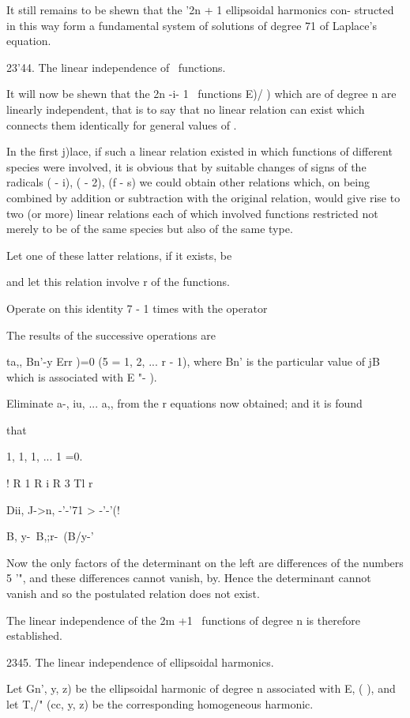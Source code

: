 {{{{{{{It still remains to be shewn that the '2n + 1 ellipsoidal harmonics
con- structed in this way form a fundamental system of solutions of
degree 71 of Laplace's equation.

23'44. The linear independence of \Lame\ functions.

It will now be shewn that the 2n -i- 1 \Lame\ functions E)/ ) which are
of degree n are linearly independent, that is to say that no linear
relation can exist which connects them identically for general values
of .

In the first j)lace, if such a linear relation existed in which
functions of different species were involved, it is obvious that by
suitable changes of signs of the radicals \/( - i), \/( - 2), \/(f -
s) we could obtain other relations which, on being combined by
addition or subtraction with the original relation, would give rise to
two (or more) linear relations each of which involved functions
restricted not merely to be of the same species but also of the same
type.

Let one of these latter relations, if it exists, be

and let this relation involve r of the functions.

Operate on this identity 7 - 1 times with the operator

The results of the successive operations are

ta,, Bn'-y Err )=0 (5 = 1, 2, ... r - 1), where Bn' is the particular
value of jB which is associated with E "- ).

%
%

Eliminate a-, iu, ... a,, from the r equations now obtained; and it
is found

that

1, 1, 1, ... 1 =0.

! R 1 R i R 3 Tl r

 Dii, J->n, -'-'71 >  -'-'(!

 B, y-\ B,;r-\ (B/y-'

Now the only factors of the determinant on the left are differences of
the numbers 5 '", and these differences cannot vanish, by.
Hence the determinant cannot vanish and so the postulated relation
does not exist.

The linear independence of the 2m +1 \Lame\ functions of degree n is
therefore established.

2345. The linear independence of ellipsoidal harmonics.

Let Gn', y, z) be the ellipsoidal harmonic of degree n associated
with E, ( ), and let T,/" (cc, y, z) be the corresponding homogeneous
harmonic.

}}}}}}}

